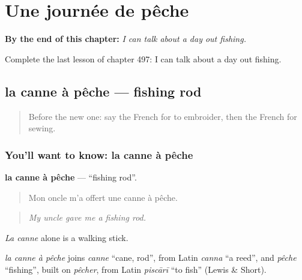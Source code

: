 
\chapter{Une journée de pêche}
\label{ch:fr-une-journee-de-peche}

\begin{chapteropening}
\textbf{By the end of this chapter:} \emph{I can talk about a day out fishing.}

Complete the last lesson of chapter 497: I can talk about a day out fishing.
\end{chapteropening}

\section[la canne à pêche]{la canne à pêche — fishing rod}

\label{lesson:FR-C497-canne-a-peche}



\begin{quote}
Before the new one: say the French for to embroider, then the French for sewing.
\end{quote}

\subsection*{You'll want to know: la canne à pêche}
\textbf{la canne à pêche} — \textquotedblleft{}fishing rod\textquotedblright{}.

\begin{quote}
Mon oncle m'a offert une canne à pêche.
\end{quote}

\begin{quote}
\emph{My uncle gave me a fishing rod.}
\end{quote}

\emph{La canne} alone is a walking stick.

\begin{cousinweb}
\emph{la canne à pêche} joins \emph{canne} \textquotedblleft{}cane, rod\textquotedblright{}, from Latin \emph{canna} \textquotedblleft{}a reed\textquotedblright{}, and \emph{pêche} \textquotedblleft{}fishing\textquotedblright{}, built on \emph{pêcher}, from Latin \emph{piscārī} \textquotedblleft{}to fish\textquotedblright{} (Lewis \& Short).
\end{cousinweb}

